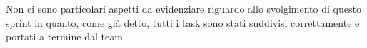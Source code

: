 Non ci sono particolari aspetti da evidenziare riguardo allo svolgimento di questo sprint in quanto, come già detto, tutti i task sono stati suddivisi correttamente e portati a termine dal team.